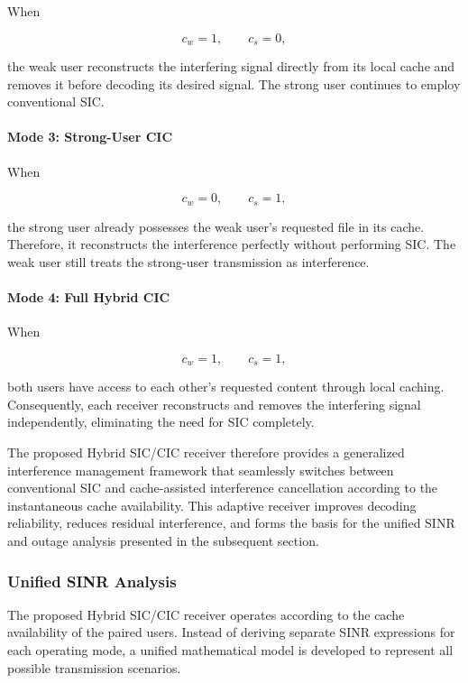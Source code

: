 \documentclass[12pt,a4paper]{article}
\begin{document}
When

\[
c_w=1,\qquad c_s=0,
\]

the weak user reconstructs the interfering signal directly from its local cache and removes it before decoding its desired signal. The strong user continues to employ conventional SIC.

\paragraph*{Mode 3: Strong-User CIC}

When

\[
c_w=0,\qquad c_s=1,
\]

the strong user already possesses the weak user's requested file in its cache. Therefore, it reconstructs the interference perfectly without performing SIC. The weak user still treats the strong-user transmission as interference.

\paragraph*{Mode 4: Full Hybrid CIC}

When

\[
c_w=1,\qquad c_s=1,
\]

both users have access to each other's requested content through local caching. Consequently, each receiver reconstructs and removes the interfering signal independently, eliminating the need for SIC completely.

The proposed Hybrid SIC/CIC receiver therefore provides a generalized interference management framework that seamlessly switches between conventional SIC and cache-assisted interference cancellation according to the instantaneous cache availability. This adaptive receiver improves decoding reliability, reduces residual interference, and forms the basis for the unified SINR and outage analysis presented in the subsequent section.
\subsubsection{Unified SINR Analysis}

The proposed Hybrid SIC/CIC receiver operates according to the cache availability of the paired users. Instead of deriving separate SINR expressions for each operating mode, a unified mathematical model is developed to represent all possible transmission scenarios.
\end{document}
